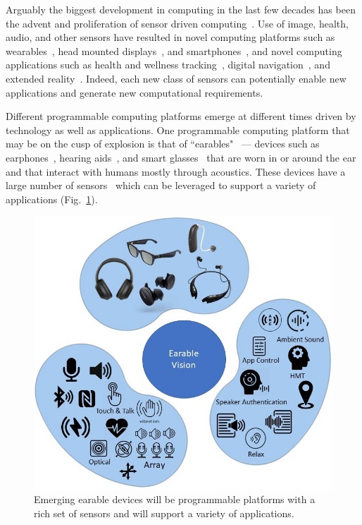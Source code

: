 Arguably the biggest development in computing in the last few decades has been
the advent and proliferation of sensor driven
computing~\cite{krishnamurthi_overview_2020}.  Use of image, health, audio, and
other sensors have resulted in novel computing platforms such as
wearables~\cite{shamma2007watch}, head mounted
displays~\cite{jensen2018review}, and smartphones~\cite{smith2013smartphone},
and novel computing applications such as health and wellness
tracking~\cite{alslaity2022mobile}, digital navigation~\cite{vvcelak2005amr},
and extended reality~\cite{huzaifa2020exploring}. Indeed, each new class of
sensors can potentially enable new applications and generate new computational
requirements.

Different programmable computing platforms emerge at different times driven by
technology as well as applications. One programmable computing platform that
may be on the cusp of explosion is that of ``earables"~\cite{rethink} ---
devices such as earphones~\cite{boseearbuds, bosesports, sonyxm3}, hearing
aids~\cite{eargoneo}, and smart glasses~\cite{boseframe, amazonframe} that are
worn in or around the ear and that interact with humans mostly through
acoustics.  These devices have a large number of sensors~\cite{sensorsinear}
which can be leveraged to support a variety of applications
(Fig.~\ref{fig:earable_vision}).

\begin{figure}
    \centering
    \includegraphics[width=\linewidth]{figs/vision_3.jpg}
    \caption{\small
        Emerging earable devices will be programmable platforms with a rich set
        of sensors and will support a variety of applications.
    }
    \label{fig:earable_vision}
\end{figure}

